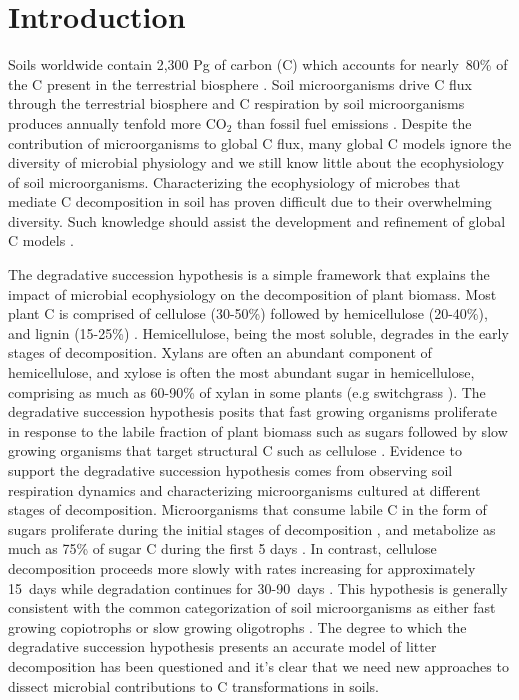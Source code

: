 \section{Introduction}
Soils worldwide contain 2,300 Pg of carbon (C) which accounts for nearly~80\%
of the C present in the terrestrial biosphere
\citep{Amundson_2001,BATJES_1996}. Soil microorganisms drive C flux through the
terrestrial biosphere and C respiration by soil microorganisms
produces annually tenfold more CO$_{2}$ than fossil fuel emissions
\citep{chapin2002principles}. Despite the contribution of microorganisms to
global C flux, many global C models ignore the diversity of microbial
physiology \citep{Allison2010,Six2006,Treseder2011} and we still know little
about the ecophysiology of soil microorganisms. Characterizing the
ecophysiology of microbes that mediate C decomposition in soil has proven
difficult due to their overwhelming diversity. Such knowledge should assist
the development and refinement of global C models
\citep{Bradford2008,Neff_2001,McGuire2010,Wieder2013}.

The degradative succession hypothesis is a simple framework that explains
the impact of microbial ecophysiology on the decomposition of plant biomass.
Most plant C is comprised of cellulose (30-50\%) followed by hemicellulose
(20-40\%), and lignin (15-25\%) \citep{Lynd2002}. Hemicellulose, being the most
soluble, degrades in the early stages of decomposition. Xylans are often an
abundant component of hemicellulose, and xylose is often the most abundant
sugar in hemicellulose, comprising as much as 60-90\% of xylan in some plants
(e.g  switchgrass \citep{Bunnell2013}). The degradative succession hypothesis
posits that fast growing organisms proliferate in response to the labile
fraction of plant biomass such as sugars \citep{Garrett1963,Bremer1994}
followed by slow growing organisms that target structural C such as cellulose
\citep{Garrett1963}. Evidence to support the degradative succession hypothesis
comes from observing soil respiration dynamics and characterizing
microorganisms cultured at different stages of decomposition.  Microorganisms
that consume labile C in the form of sugars proliferate during the initial
stages of decomposition \citep{Garrett1951,Alexander1964}, and metabolize as
much as 75\% of sugar C during the first 5 days \citep{Engelking2007}. In
contrast, cellulose decomposition proceeds more slowly with rates increasing
for approximately 15~days while degradation continues for 30-90~days
\citep{Hu1997,Engelking2007}. This hypothesis is generally consistent with the
common categorization of soil microorganisms as either fast growing copiotrophs
or slow growing oligotrophs \citep{Fierer2007}.  The degree to which the
degradative succession hypothesis presents an accurate model of litter
decomposition has been questioned
\citep{AnneliseHKjoller2002,Frankland_1998,Osono_2005} and it's clear that we
need new approaches to dissect microbial contributions to C transformations in
soils.


